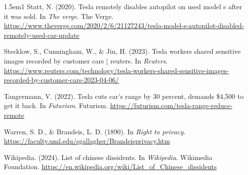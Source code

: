 \documentclass[11pt]{article}
\begin{document}
\begin{hangparas}{1.5em}{1}
\hypertarget{citeproc_bib_item_9}{Statt, N. (2020). Tesla remotely disables autopilot on used model s after it was sold. In \textit{The verge}. The Verge. \url{https://www.theverge.com/2020/2/6/21127243/tesla-model-s-autopilot-disabled-remotely-used-car-update}}

\hypertarget{citeproc_bib_item_10}{Stecklow, S., Cunningham, W., \& Jin, H. (2023). Tesla workers shared sensitive images recorded by customer cars | reuters. In \textit{Reuters}. \url{https://www.reuters.com/technology/tesla-workers-shared-sensitive-images-recorded-by-customer-cars-2023-04-06/}}

\hypertarget{citeproc_bib_item_11}{Tangermann, V. (2022). Tesla cuts car’s range by 30 percent, demands \$4,500 to get it back. In \textit{Futurism}. Futurism. \url{https://futurism.com/tesla-range-reduce-remote}}

\hypertarget{citeproc_bib_item_12}{Warren, S. D., \& Brandeis, L. D. (1890). In \textit{Right to privacy}. \url{https://faculty.uml.edu/sgallagher/Brandeisprivacy.htm}}

\hypertarget{citeproc_bib_item_13}{Wikipedia. (2024). List of chinese dissidents. In \textit{Wikipedia}. Wikimedia Foundation. \url{https://en.wikipedia.org/wiki/List_of_Chinese_dissidents}}\bigskip
\end{hangparas}
\end{document}

